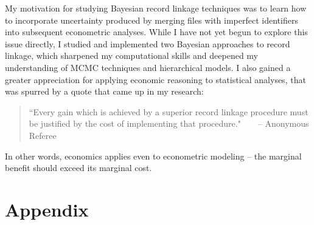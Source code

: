 \documentclass[11pt,reqno]{amsart}
\begin{document}
My motivation for studying Bayesian record linkage techniques was to learn how to incorporate uncertainty produced by merging files with imperfect identifiers into subsequent econometric analyses.  While I have not yet begun to explore this issue directly, I studied and implemented two Bayesian approaches to record linkage, which sharpened my computational skills and deepened my understanding of MCMC techniques and hierarchical models.  I also gained a greater appreciation for applying economic reasoning to statistical analyses, that was spurred by a quote that came up in my research: 

\begin{quote}
``Every gain which is achieved by a superior record linkage procedure must be justified by the cost of implementing that procedure."\ \ \ \    -- Anonymous Referee 
\end{quote}

In other words, economics applies even to econometric modeling -- the marginal benefit should exceed its marginal cost. 

\newpage




\newpage
\appendix
\section{Appendix}
\end{document}
